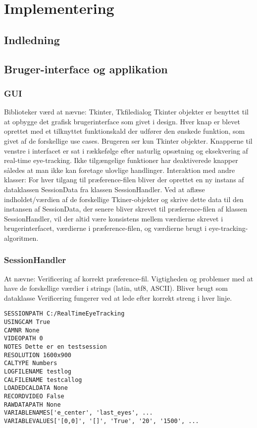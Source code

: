 \documentclass[rapport.tex]{subfiles}
\begin{document}
\section{Implementering}
	\subsection{Indledning}
	\subsection{Bruger-interface og applikation}
	\subsubsection{GUI}
	Biblioteker værd at nævne: Tkinter, Tkfiledialog
	Tkinter objekter er benyttet til at opbygge det grafisk brugerinterface som givet i design. 
	Hver knap er blevet oprettet med et tilknyttet funktionskald der udfører den ønskede funktion, som givet af de forskellige use cases. 
	Brugeren ser kun Tkinter objekter. 
	Knapperne til venstre i interfacet er sat i rækkefølge efter naturlig opsætning og eksekvering af real-time eye-tracking. Ikke tilgængelige funktioner har deaktiverede knapper således at man ikke kan foretage ulovlige handlinger. 
	Interaktion med andre klasser:
	For hver tilgang til præference-filen bliver der oprettet en ny instans af dataklassen SessionData fra klassen SessionHandler. Ved at aflæse indholdet/værdien af de forskellige Tkiner-objekter og skrive dette data til den instansen af SessionData, der senere bliver skrevet til præference-filen af klassen SessionHandler, vil der altid være konsistens mellem værdierne skrevet i brugerinterfacet, værdierne i præference-filen, og værdierne brugt i eye-tracking-algoritmen. 
	
	\subsubsection{SessionHandler}
	At nævne: Verificering af korrekt præference-fil. Vigtigheden og problemer med at have de forskellige værdier i strings (latin, utf8, ASCII). Bliver brugt som dataklasse
	Verificering fungerer ved at lede efter korrekt streng i hver linje. \\
	
\begin{lstlisting}
SESSIONPATH C:/RealTimeEyeTracking
USINGCAM True
CAMNR None
VIDEOPATH 0
NOTES Dette er en testsession
RESOLUTION 1600x900
CALTYPE Numbers
LOGFILENAME testlog
CALFILENAME testcallog
LOADEDCALDATA None
RECORDVIDEO False
RAWDATAPATH None
VARIABLENAMES['e_center', 'last_eyes', ...
VARIABLEVALUES['[0,0]', '[]', 'True', '20', '1500', ...
\end{lstlisting}
		
\end{document}
